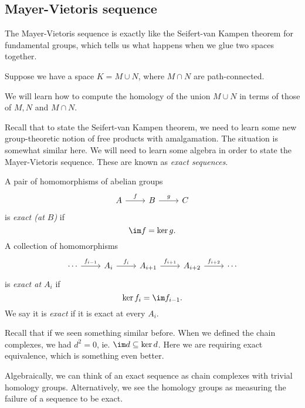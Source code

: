 \documentclass[a4paper]{article}
\begin{document}
\subsection{Mayer-Vietoris sequence}
The Mayer-Vietoris sequence is exactly like the Seifert-van Kampen theorem for fundamental groups, which tells us what happens when we glue two spaces together.

Suppose we have a space $K = M\cup N$, where $M \cap N$ are path-connected.
\begin{center}
\end{center}
We will learn how to compute the homology of the union $M\cup N$ in terms of those of $M, N$ and $M\cap N$.

Recall that to state the Seifert-van Kampen theorem, we need to learn some new group-theoretic notion of free products with amalgamation. The situation is somewhat similar here. We will need to learn some algebra in order to state the Mayer-Vietoris sequence. These are known as \emph{exact sequences}.

\begin{defi}
  A pair of homomorphisms of abelian groups
  \[
    \begin{tikzcd}
      A \ar [r, "f"] & B \ar [r, "g"] & C
    \end{tikzcd}
  \]
  is \emph{exact (at $B$)} if
  \[
    \im f = \ker g.
  \]
  A collection of homomorphisms
  \[
    \begin{tikzcd}
      \cdots \ar [r, "f_{i - 1}"] & A_{i} \ar [r, "f_i"] & A_{i + 1} \ar [r, "f_{i + 1}"] & A_{i + 2} \ar[r, "f_{i + 2}"] & \cdots
    \end{tikzcd}
  \]
  is \emph{exact at $A_i$} if
  \[
    \ker f_i= \im f_{i - 1}.
  \]
  We say it is \emph{exact} if it is exact at every $A_i$.
\end{defi}
Recall that if we seen something similar before. When we defined the chain complexes, we had $d^2 = 0$, ie. $\im d \subseteq \ker d$. Here we are requiring exact equivalence, which is something even better.

Algebraically, we can think of an exact sequence as chain complexes with trivial homology groups. Alternatively, we see the homology groups as measuring the failure of a sequence to be exact.
\end{document}

